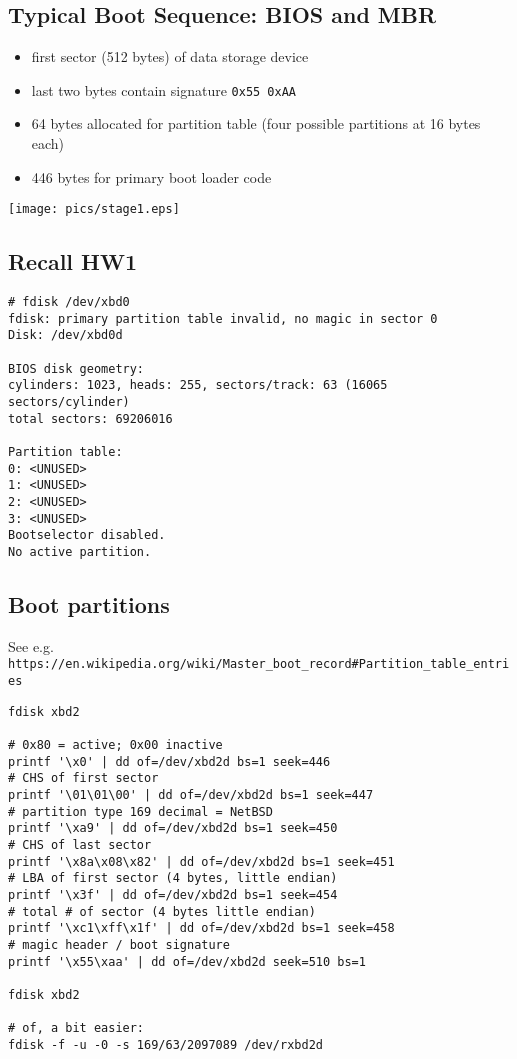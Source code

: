 \documentclass[xga]{xdvislides}
\begin{document}
\subsection{Typical Boot Sequence: BIOS and MBR}
\begin{minipage}[c]{0.7\textwidth}
\begin{itemize}
	\item first sector (512 bytes) of data storage device
	\item last two bytes contain signature \verb+0x55 0xAA+
	\item 64 bytes allocated for partition table (four possible
		partitions at 16 bytes each)
	\item 446 bytes for primary boot loader code
\end{itemize}
\end{minipage}
\begin{minipage}[c]{0.1\textwidth}
\texttt{[image: pics/stage1.eps]} \\
\end{minipage}

\subsection{Recall HW1}
\begin{verbatim}
# fdisk /dev/xbd0
fdisk: primary partition table invalid, no magic in sector 0
Disk: /dev/xbd0d

BIOS disk geometry:
cylinders: 1023, heads: 255, sectors/track: 63 (16065 sectors/cylinder)
total sectors: 69206016

Partition table:
0: <UNUSED>
1: <UNUSED>
2: <UNUSED>
3: <UNUSED>
Bootselector disabled.
No active partition.
\end{verbatim}

\subsection{Boot partitions}
See e.g. {\tt
https://en.wikipedia.org/wiki/Master\_boot\_record\#Partition\_table\_entries}
\smallish
\begin{verbatim}
fdisk xbd2

# 0x80 = active; 0x00 inactive
printf '\x0' | dd of=/dev/xbd2d bs=1 seek=446
# CHS of first sector
printf '\01\01\00' | dd of=/dev/xbd2d bs=1 seek=447
# partition type 169 decimal = NetBSD
printf '\xa9' | dd of=/dev/xbd2d bs=1 seek=450
# CHS of last sector
printf '\x8a\x08\x82' | dd of=/dev/xbd2d bs=1 seek=451
# LBA of first sector (4 bytes, little endian)
printf '\x3f' | dd of=/dev/xbd2d bs=1 seek=454
# total # of sector (4 bytes little endian)
printf '\xc1\xff\x1f' | dd of=/dev/xbd2d bs=1 seek=458
# magic header / boot signature
printf '\x55\xaa' | dd of=/dev/xbd2d seek=510 bs=1

fdisk xbd2

# of, a bit easier:
fdisk -f -u -0 -s 169/63/2097089 /dev/rxbd2d
\end{verbatim}
\end{document}
